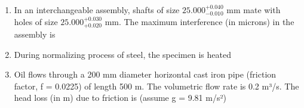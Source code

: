 \documentclass[journal,12pt,onecolumn]{IEEEtran}
\begin{document}
\begin{enumerate}
    \item In an interchangeable assembly, shafts of size \(25.000^{+0.040}_{-0.010}\) mm mate with holes of size \(25.000^{+0.030}_{+0.020}\) mm. The maximum interference (in microns) in the assembly is

          \begin{enumerate}
          \end{enumerate}

    \item During normalizing process of steel, the specimen is heated

          \begin{enumerate}
          \end{enumerate}

    \item Oil flows through a 200 mm diameter horizontal cast iron pipe (friction factor, f = 0.0225) of length 500 m. The volumetric flow rate is 0.2 m³/s. The head loss (in m) due to friction is (assume g = 9.81 m/s²)

          \begin{enumerate}
          \end{enumerate}


\end{enumerate}
\end{document}
